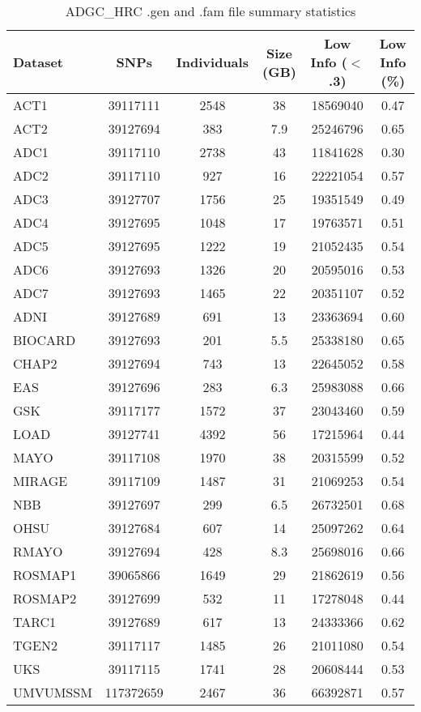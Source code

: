 \documentclass[12pt]{article}
\begin{document}
\begin{table}[H] \caption{ADGC\_HRC .gen and .fam file summary statistics}
\begin{center}
\begin{tabular}{lccccc}
\hline
Dataset & SNPs & Individuals & Size (GB) & Low Info ($<$.3) & Low Info (\%) \\ \hline
ACT1 & 39117111 & 2548 & 38 & 18569040 & 0.47 \\
ACT2 & 39127694 & 383 & 7.9 & 25246796 & 0.65 \\
ADC1 & 39117110 & 2738 & 43 & 11841628 & 0.30 \\
ADC2 & 39117110 & 927 & 16 & 22221054 & 0.57 \\
ADC3 & 39127707 & 1756 & 25 & 19351549 & 0.49 \\
ADC4 & 39127695 & 1048 & 17 & 19763571 & 0.51 \\
ADC5 & 39127695 & 1222 & 19 & 21052435 & 0.54 \\
ADC6 & 39127693 & 1326 & 20 & 20595016 & 0.53 \\
ADC7 & 39127693 & 1465 & 22 & 20351107 & 0.52 \\
ADNI & 39127689 & 691 & 13 & 23363694 & 0.60 \\
BIOCARD & 39127693 & 201 & 5.5 & 25338180 & 0.65 \\
CHAP2 & 39127694 & 743 & 13 & 22645052 & 0.58 \\
EAS & 39127696 & 283 & 6.3 & 25983088 & 0.66 \\
GSK & 39117177 & 1572 & 37 & 23043460 & 0.59 \\
LOAD & 39127741 & 4392 & 56 & 17215964 & 0.44 \\
MAYO & 39117108 & 1970 & 38 & 20315599 & 0.52 \\
MIRAGE & 39117109 & 1487 & 31 & 21069253 & 0.54 \\
NBB & 39127697 & 299 & 6.5 & 26732501 & 0.68 \\
OHSU & 39127684 & 607 & 14 & 25097262 & 0.64 \\
RMAYO & 39127694 & 428 & 8.3 & 25698016 & 0.66 \\
ROSMAP1 & 39065866 & 1649 & 29 & 21862619 & 0.56 \\
ROSMAP2 & 39127699 & 532 & 11 & 17278048 & 0.44 \\
TARC1 & 39127689 & 617 & 13 & 24333366 & 0.62 \\
TGEN2 & 39117117 & 1485 & 26 & 21011080 & 0.54 \\
UKS & 39117115 & 1741 & 28 & 20608444 & 0.53 \\
UMVUMSSM & 117372659 & 2467 & 36 & 66392871 & 0.57 \\

\end{tabular}
\end{center}
\end{table}
\end{document}
